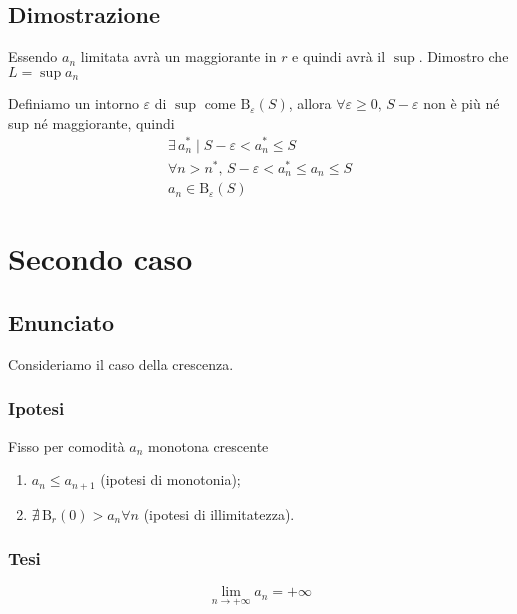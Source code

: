 \documentclass[../../dimostrazioni]{subfiles}
\begin{document}
            \subsection*{Dimostrazione}
                Essendo \(a_n\) limitata avrà un maggiorante in \(r\) e quindi avrà il \(\sup\).
                Dimostro che \(L = \sup{a_n}\)

                Definiamo un intorno \(\varepsilon\) di \(\sup\) come \(\mathrm{B}_\varepsilon (S)\), allora
                \(\forall \varepsilon \geqslant 0, \, S-\varepsilon\) non è più né sup né maggiorante, quindi
                \begin{gather*}
                    \exists \, a_n^* \mid S-\varepsilon < a_n^* \leqslant S \\
                    \forall n > n^*, \, S-\varepsilon < a_n^* \leqslant a_n \leqslant S \\
                    a_n \in \mathrm{B}_\varepsilon(S) 
                \end{gather*}
                
        \newpage

        \section*{Secondo caso}

            \subsection*{Enunciato}

            Consideriamo il caso della crescenza.
                
            \subsubsection*{Ipotesi}
                 
            Fisso per comodità \(a_n\) monotona crescente

            \begin{enumerate}
               \indentitem \item \(a_n \leqslant a_{n+1}\) (ipotesi di monotonia);
               \indentitem \item \(\nexists \, \mathrm{B}_r(0) > {a_n} \forall n \) (ipotesi di illimitatezza).
            \end{enumerate}
        
            \subsubsection*{Tesi}
                \[\lim_{n \to +\infty} a_n = +\infty\]
    
\end{document}
